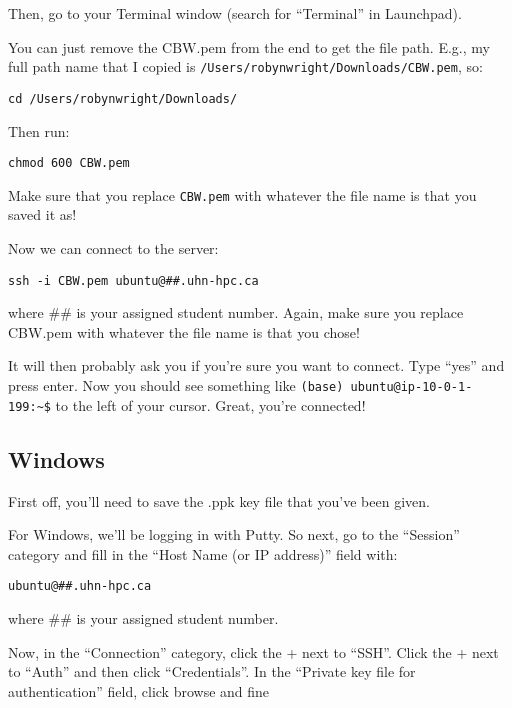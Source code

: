 \documentclass[
]{book}
\begin{document}
Then, go to your Terminal window (search for ``Terminal'' in Launchpad).

You can just remove the CBW.pem from the end to get the file path. E.g., my full path name that I copied is \texttt{/Users/robynwright/Downloads/CBW.pem}, so:

\begin{verbatim}
cd /Users/robynwright/Downloads/
\end{verbatim}

Then run:

\begin{verbatim}
chmod 600 CBW.pem
\end{verbatim}

Make sure that you replace \texttt{CBW.pem} with whatever the file name is that you saved it as!

Now we can connect to the server:

\begin{verbatim}
ssh -i CBW.pem ubuntu@##.uhn-hpc.ca
\end{verbatim}

where \#\# is your assigned student number. Again, make sure you replace CBW.pem with whatever the file name is that you chose!

It will then probably ask you if you're sure you want to connect. Type ``yes'' and press enter. Now you should see something like \texttt{(base)\ ubuntu@ip-10-0-1-199:\textasciitilde{}\$} to the left of your cursor. Great, you're connected!

\subsection{Windows}\label{windows}

First off, you'll need to save the .ppk key file that you've been given.

For Windows, we'll be logging in with Putty. So next, go to the ``Session'' category and fill in the ``Host Name (or IP address)'' field with:

\begin{verbatim}
ubuntu@##.uhn-hpc.ca
\end{verbatim}

where \#\# is your assigned student number.

Now, in the ``Connection'' category, click the + next to ``SSH''. Click the + next to ``Auth'' and then click ``Credentials''. In the ``Private key file for authentication'' field, click browse and fine
\end{document}
